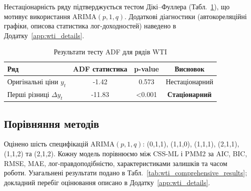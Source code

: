 \documentclass[12pt,a4paper]{article}
\begin{document}
Нестаціонарність ряду підтверджується тестом Дікі--Фуллера (Табл.~\ref{tab:wti_adf_test}), що мотивує використання ARIMA$(p,1,q)$. Додаткові діагностики (автокореляційні графіки, описова статистика лог-доходностей) наведено в Додатку~\ref{app:wti_details}.

\begin{table}[htbp]
\centering
\caption{Результати тесту ADF для рядів WTI}
\label{tab:wti_adf_test}
\begin{tabular}{lccc}
\toprule
\textbf{Ряд} & \textbf{ADF статистика} & \textbf{p-value} & \textbf{Висновок} \\
\midrule
Оригінальні ціни $y_t$ & -1.42 & 0.573 & Нестаціонарний \\
Перші різниці $\Delta y_t$ & -11.83 & <0.001 & \textbf{Стаціонарний} \\
\bottomrule
\end{tabular}
\end{table}

\subsection{Порівняння методів}
\label{subsec:wti_results}

Оцінено шість специфікацій ARIMA$(p,1,q)$: (0,1,1), (1,1,0), (1,1,1), (2,1,1), (1,1,2) та (2,1,2). Кожну модель порівнюємо між CSS-ML і PMM2 за AIC, BIC, RMSE, MAE, лог-правдоподібністю, характеристиками залишків та часом роботи. Узагальнені результати подано в Табл.~\ref{tab:wti_comprehensive_results}; докладний перебіг оцінювання описано в Додатку~\ref{app:wti_details}.
\end{document}
